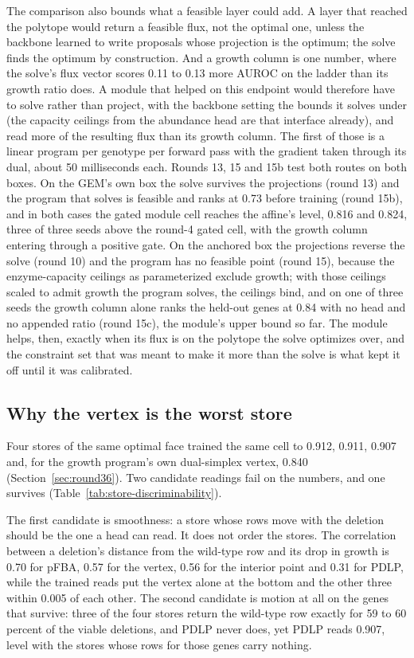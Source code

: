 The comparison also bounds what a feasible layer could add. A layer that reached the
polytope would return a feasible flux, not the optimal one, unless the backbone learned
to write proposals whose projection is the optimum; the solve finds the optimum by
construction. And a growth column is one number, where the solve's flux vector scores
0.11 to 0.13 more AUROC on the ladder than its growth ratio does. A module that helped on this
endpoint would therefore have to solve rather than project, with the backbone setting
the bounds it solves under (the capacity ceilings from the abundance head are that
interface already), and read more of the resulting flux than its growth column. The
first of those is a linear program per genotype per forward pass with the gradient taken
through its dual, about 50 milliseconds each. Rounds 13, 15 and 15b test both routes on
both boxes. On the GEM's own box the solve survives the projections (round 13) and the
program that solves is feasible and ranks at 0.73 before training (round 15b), and in
both cases the gated module cell reaches the affine's level, 0.816 and 0.824, three of
three seeds above the round-4 gated cell, with the growth column entering through a
positive gate. On the anchored box the projections reverse the solve (round 10) and the
program has no feasible point (round 15), because the enzyme-capacity ceilings as
parameterized exclude growth; with those ceilings scaled to admit growth the program
solves, the ceilings bind, and on one of three seeds the growth column alone ranks the
held-out genes at 0.84 with no head and no appended ratio (round 15c), the module's
upper bound so far. The module helps, then, exactly when its flux is on the polytope
the solve optimizes over, and the constraint set that was meant to make it more than the
solve is what kept it off until it was calibrated.

\subsection{Why the vertex is the worst store}
\label{sec:store-discriminability}

Four stores of the same optimal face trained the same cell to 0.912, 0.911, 0.907 and,
for the growth program's own dual-simplex vertex, 0.840 (Section~\ref{sec:round36}).
Two candidate readings fail on the numbers, and one survives
(Table~\ref{tab:store-discriminability}).



The first candidate is smoothness: a store whose rows move with the deletion should be
the one a head can read. It does not order the stores. The correlation between a
deletion's distance from the wild-type row and its drop in growth is 0.70 for pFBA,
0.57 for the vertex, 0.56 for the interior point and 0.31 for PDLP, while the trained
reads put the vertex alone at the bottom and the other three within 0.005 of each
other. The second candidate is motion at all on the genes that survive: three of the
four stores return the wild-type row exactly for 59 to 60 percent of the viable
deletions, and PDLP never does, yet PDLP reads 0.907, level with the stores whose rows
for those genes carry nothing.

